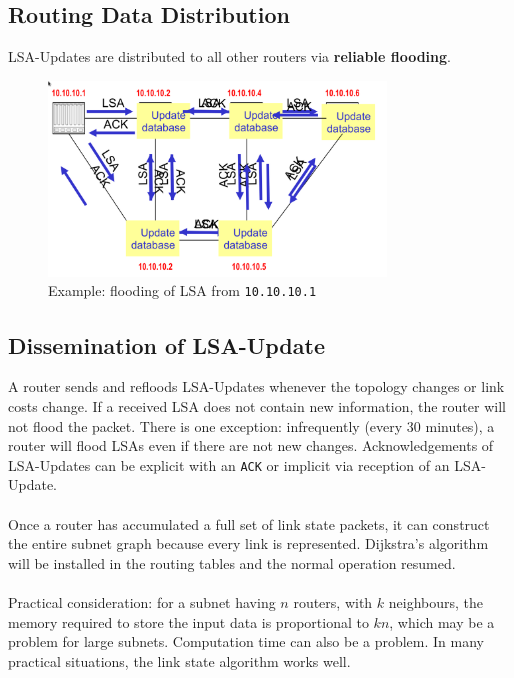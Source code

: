 \documentclass[a4paper,11pt]{article}
\begin{document}
\subsection{Routing Data Distribution}
LSA-Updates are distributed to all other routers via \textbf{reliable flooding}.
\begin{figure}[H]
    \centering
    \includegraphics[width=0.8\textwidth]{./images/routing_data_distribution.png}
    \caption{Example: flooding of LSA from \texttt{10.10.10.1}}
\end{figure}

\subsection{Dissemination of LSA-Update}
A router sends and refloods LSA-Updates whenever the topology changes or link costs change.
If a received LSA does not contain new information, the router will not flood the packet.
There is one exception: infrequently (every 30 minutes), a router will flood LSAs even if there are not new changes.
Acknowledgements of LSA-Updates can be explicit with an \verb|ACK| or implicit via reception of an LSA-Update.
\\\\
Once a router has accumulated a full set of link state packets, it can construct the entire subnet graph because every 
link is represented. 
Dijkstra's algorithm will be installed in the routing tables and the normal operation resumed.
\\\\
Practical consideration: for a subnet having $n$ routers, with $k$ neighbours, the memory required to store the input 
data is proportional to $kn$, which may be a problem for large subnets.
Computation time can also be a problem.
In many practical situations, the link state algorithm works well.
\end{document}
